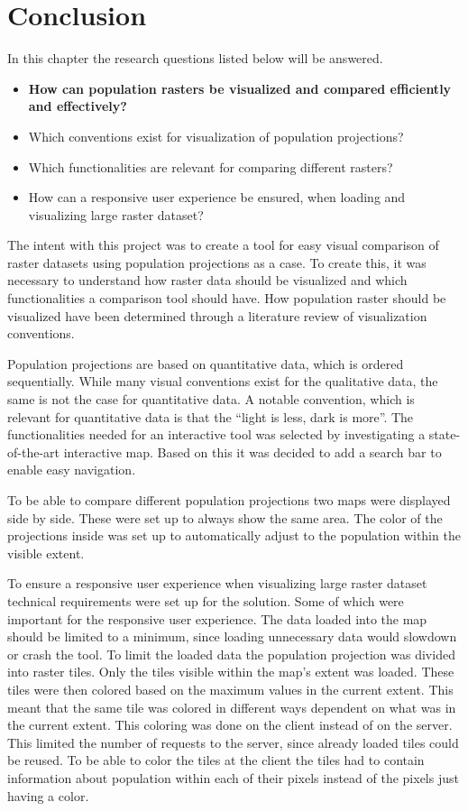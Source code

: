 \chapter{Conclusion}\label{CConclusion}
In this chapter the research questions listed below will be answered.

\begin{itemize}
	\item \textbf{How can population rasters be visualized and compared efficiently and effectively?}
	\item Which conventions exist for visualization of population projections?
	\item Which functionalities are relevant for comparing different rasters?
	\item How can a responsive user experience be ensured, when loading and visualizing large raster dataset?
\end{itemize}


The intent with this project was to create a tool for easy visual comparison of raster datasets using population projections as a case. To create this, it was necessary to understand how raster data should be visualized and which functionalities a comparison tool should have.
How population raster should be visualized have been determined through a literature review of visualization conventions. 	

Population projections are based on quantitative data, which is ordered sequentially. While many visual conventions exist for the qualitative data, the same is not the case for quantitative data. A notable convention, which is relevant for quantitative data is that the “light is less, dark is more”.
The functionalities needed for an interactive tool was selected by investigating a state-of-the-art interactive map. Based on this it was decided to add a search bar to enable easy navigation. 

To be able to compare different population projections two maps were displayed side by side. These were set up to always show the same area. The color of the projections inside was set up to automatically adjust to the population within the visible extent.


To ensure a responsive user experience when visualizing large raster dataset technical requirements were set up for the solution. Some of which were important for the responsive user experience. The data loaded into the map should be limited to a minimum, since loading unnecessary data would slowdown or crash the tool. To limit the loaded data the population projection was divided into raster tiles. Only the tiles visible within the map’s extent was loaded. These tiles were then colored based on the maximum values in the current extent. This meant that the same tile was colored in different ways dependent on what was in the current extent. This coloring was done on the client instead of on the server.  This limited the number of requests to the server, since already loaded tiles could be reused. To be able to color the tiles at the client the tiles had to contain information about population within each of their pixels instead of the pixels just having a color.

